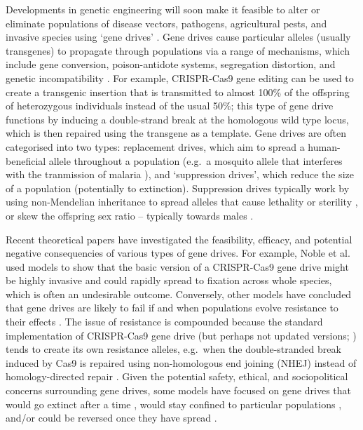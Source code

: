 \documentclass[]{rsos}%
\begin{document}
Developments in genetic engineering will soon make it feasible to alter
or eliminate populations of disease vectors, pathogens, agricultural
pests, and invasive species using `gene drives'
\citep{gantz2015hi, hammond2016cr, wang2016cr, prowse2017do, kyrou2018cr, noble2018cu}.
Gene drives cause particular alleles (usually transgenes) to propagate
through populations via a range of mechanisms, which include gene
conversion, poison-antidote systems, segregation distortion, and genetic
incompatibility \citep{lindholm2016ec, champer2016ch, oberhofer2019cl}.
For example, CRISPR-Cas9 gene editing can be used to create a transgenic
insertion that is transmitted to almost 100\% of the offspring of
heterozygous individuals instead of the usual 50\%; this type of gene
drive functions by inducing a double-strand break at the homologous wild
type locus, which is then repaired using the transgene as a template.
Gene drives are often categorised into two types: replacement drives,
which aim to spread a human-beneficial allele throughout a population
(e.g.~a mosquito allele that interferes with the tranmission of malaria
\citep{gantz2015hi, marshall2015gene}), and `suppression drives', which
reduce the size of a population (potentially to extinction). Suppression
drives typically work by using non-Mendelian inheritance to spread
alleles that cause lethality or sterility
\citep{hammond2016cr, kyrou2018cr, maselko2018ge}, or skew the offspring
sex ratio -- typically towards males
\citep{windbichler2008ta, galizi2014sy, beaghton2017ve, burt2018se, papathanos2018re}.

Recent theoretical papers have investigated the feasibility, efficacy,
and potential negative consequencies of various types of gene drives.
For example, Noble et al. \citep{noble2018cu} used models to show that
the basic version of a CRISPR-Cas9 gene drive might be highly invasive
and could rapidly spread to fixation across whole species, which is
often an undesirable outcome. Conversely, other models have concluded
that gene drives are likely to fail if and when populations evolve
resistance to their effects \citep{drury2017cr, unckless2017ev}. The
issue of resistance is compounded because the standard implementation of
CRISPR-Cas9 gene drive (but perhaps not updated versions;
\citep{esvelt2014em, unckless2017ev, prowse2017do, kyrou2018cr}) tends
to create its own resistance alleles, e.g.~when the double-stranded
break induced by Cas9 is repaired using non-homologous end joining
(NHEJ) instead of homology-directed repair
\citep{gantz2015mu, gantz2015hi, hammond2016cr, wang2016cr, unckless2017ev}.
Given the potential safety, ethical, and sociopolitical concerns
surrounding gene drives, some models have focused on gene drives that
would go extinct after a time
\citep{min2017da, burt2018se, noble2019da}, would stay confined to
particular populations \citep{maselko2018ge, noble2019da}, and/or could
be reversed once they have spread \citep{vella2017ev}.
\end{document}
